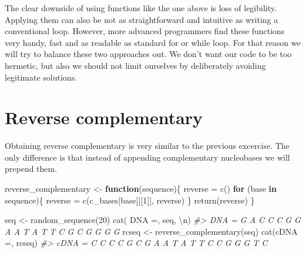 \documentclass[
]{book}
\newenvironment{Shaded}{\begin{snugshade}}{\end{snugshade}}
\newcommand{\CommentTok}[1]{\textcolor[rgb]{0.56,0.35,0.01}{\textit{#1}}}
\newcommand{\ControlFlowTok}[1]{\textcolor[rgb]{0.13,0.29,0.53}{\textbf{#1}}}
\newcommand{\DecValTok}[1]{\textcolor[rgb]{0.00,0.00,0.81}{#1}}
\newcommand{\FunctionTok}[1]{\textcolor[rgb]{0.00,0.00,0.00}{#1}}
\newcommand{\NormalTok}[1]{#1}
\newcommand{\OtherTok}[1]{\textcolor[rgb]{0.56,0.35,0.01}{#1}}
\newcommand{\SpecialCharTok}[1]{\textcolor[rgb]{0.00,0.00,0.00}{#1}}
\newcommand{\StringTok}[1]{\textcolor[rgb]{0.31,0.60,0.02}{#1}}
\begin{document}
The clear downside of using functions like the one above is loss of legibility. Applying them can also be not as straightforward and intuitive as writing a conventional loop. However, more advanced programmers find these functions very handy, fast and as readable as standard for or while loop. For that reason we will try to balance these two approaches out. We don't want our code to be too hermetic, but also we should not limit ourselves by deliberately avoiding legitimate solutions.

\hypertarget{reverse-complementary}{%
\section{Reverse complementary}\label{reverse-complementary}}

Obtaining reverse complementary is very similar to the previous excercise. The only difference is that instead of appending complementary nucleobases we will prepend them.

\begin{Shaded}
\begin{Highlighting}[]
\NormalTok{reverse\_complementary }\OtherTok{\textless{}{-}} \ControlFlowTok{function}\NormalTok{(sequence)\{}
\NormalTok{  reverse }\OtherTok{=} \FunctionTok{c}\NormalTok{()}
  \ControlFlowTok{for}\NormalTok{ (base }\ControlFlowTok{in}\NormalTok{ sequence)\{}
\NormalTok{    reverse }\OtherTok{=} \FunctionTok{c}\NormalTok{(c\_bases[base][[}\DecValTok{1}\NormalTok{]], reverse)}
\NormalTok{  \}}
  \FunctionTok{return}\NormalTok{(reverse)}
\NormalTok{\}}
\end{Highlighting}
\end{Shaded}

\begin{Shaded}
\begin{Highlighting}[]
\NormalTok{seq }\OtherTok{\textless{}{-}} \FunctionTok{random\_sequence}\NormalTok{(}\DecValTok{20}\NormalTok{)}
\FunctionTok{cat}\NormalTok{(}\StringTok{\textquotesingle{} DNA =\textquotesingle{}}\NormalTok{, seq, }\StringTok{\textquotesingle{}}\SpecialCharTok{\textbackslash{}n}\StringTok{\textquotesingle{}}\NormalTok{)}
\CommentTok{\#\textgreater{}  DNA = G A C C C G G A A T A T T C G C G G G G}
\NormalTok{rcseq }\OtherTok{\textless{}{-}} \FunctionTok{reverse\_complementary}\NormalTok{(seq)}
\FunctionTok{cat}\NormalTok{(}\StringTok{\textquotesingle{}cDNA =\textquotesingle{}}\NormalTok{, rcseq)}
\CommentTok{\#\textgreater{} cDNA = C C C C G C G A A T A T T C C G G G T C}
\end{Highlighting}
\end{Shaded}
\end{document}
